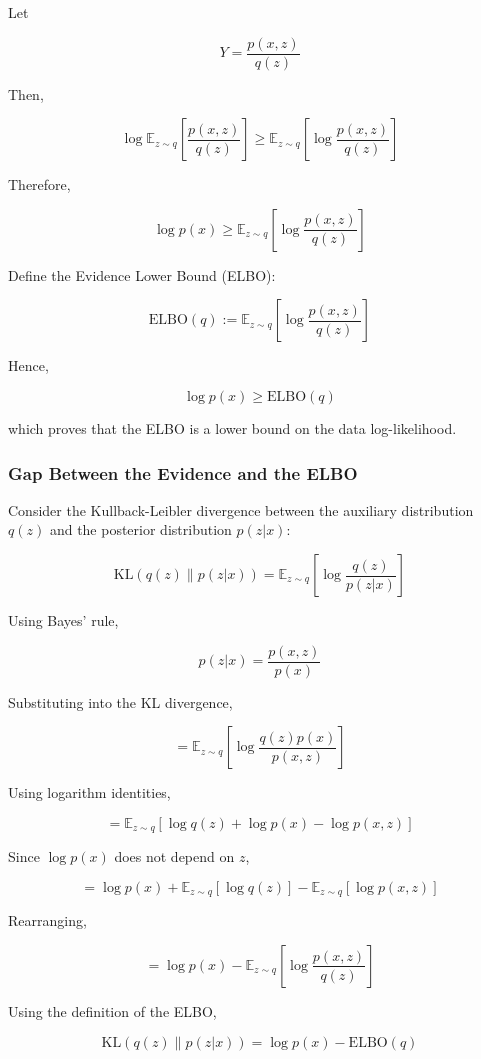 \documentclass[12pt]{article}
\begin{document}
Let

\[
Y
=
\frac{p(x,z)}{q(z)}
\]

Then,

\[
\log \mathbb E_{z\sim q}
\left[
\frac{p(x,z)}{q(z)}
\right]
\geq
\mathbb E_{z\sim q}
\left[
\log \frac{p(x,z)}{q(z)}
\right]
\]

Therefore,

\[
\log p(x)
\geq
\mathbb E_{z\sim q}
\left[
\log \frac{p(x,z)}{q(z)}
\right]
\]

Define the Evidence Lower Bound (ELBO):

\[
\mathrm{ELBO}(q)
:=
\mathbb E_{z\sim q}
\left[
\log \frac{p(x,z)}{q(z)}
\right]
\]

Hence,

\[
\boxed{
\log p(x)
\geq
\mathrm{ELBO}(q)
}
\]

which proves that the ELBO is a lower bound on the data log-likelihood.

\subsubsection*{Gap Between the Evidence and the ELBO}

Consider the Kullback-Leibler divergence between the auxiliary distribution \(q(z)\) and the posterior distribution \(p(z|x)\):

\[
\mathrm{KL}(q(z)\|p(z|x))
=
\mathbb E_{z\sim q}
\left[
\log \frac{q(z)}{p(z|x)}
\right]
\]

Using Bayes' rule,

\[
p(z|x)
=
\frac{p(x,z)}{p(x)}
\]

Substituting into the KL divergence,

\[
=
\mathbb E_{z\sim q}
\left[
\log
\frac{q(z)p(x)}{p(x,z)}
\right]
\]

Using logarithm identities,

\[
=
\mathbb E_{z\sim q}
\left[
\log q(z)
+
\log p(x)
-
\log p(x,z)
\right]
\]

Since \(\log p(x)\) does not depend on \(z\),

\[
=
\log p(x)
+
\mathbb E_{z\sim q}[\log q(z)]
-
\mathbb E_{z\sim q}[\log p(x,z)]
\]

Rearranging,

\[
=
\log p(x)
-
\mathbb E_{z\sim q}
\left[
\log \frac{p(x,z)}{q(z)}
\right]
\]

Using the definition of the ELBO,

\[
\boxed{
\mathrm{KL}(q(z)\|p(z|x))
=
\log p(x)
-
\mathrm{ELBO}(q)
}
\]
\end{document}

